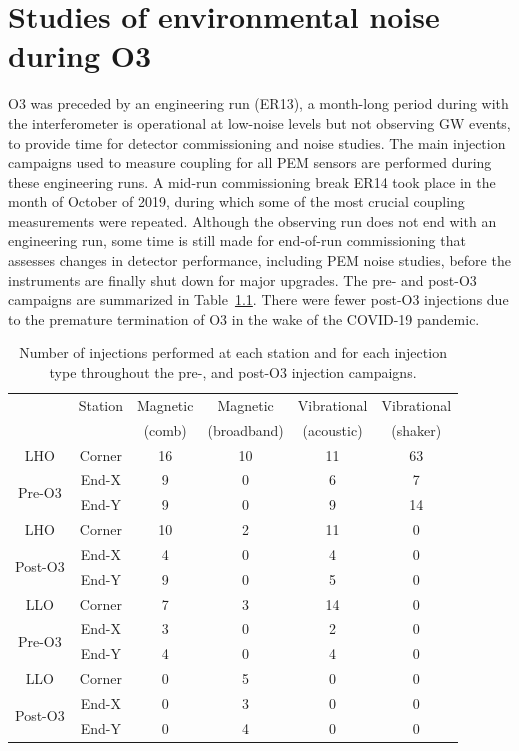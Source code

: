 \chapter{Studies of environmental noise during O3}\label{ch:noise-studies}

\ac{O3} was preceded by an engineering run (ER13), a month-long period during with the interferometer is operational at low-noise levels but not observing \ac{GW} events, to provide time for detector commissioning and noise studies.
The main injection campaigns used to measure coupling for all PEM sensors are performed during these engineering runs.
A mid-run commissioning break ER14 took place in the month of October of 2019, during which some of the most crucial coupling measurements were repeated.
Although the observing run does not end with an engineering run, some time is still made for end-of-run commissioning that assesses changes in detector performance, including PEM noise studies, before the instruments are finally shut down for major upgrades.
The pre- and post-O3 campaigns are summarized in Table~\ref{tab:noise-campaigns}.
There were fewer post-O3 injections due to the premature termination of O3 in the wake of the COVID-19 pandemic.

\begin{table}[htb]
	\caption{Number of injections performed at each station and for each injection type throughout the pre-, and post-O3 injection campaigns.}
	\label{tab:noise-campaigns}
	\begin{tabular}{|c|ccccc|}
		\hline
		& Station & Magnetic & Magnetic & Vibrational & Vibrational \\
		& & (comb) & (broadband) & (acoustic) & (shaker) \\
		\hline
		LHO & Corner & 16 & 10 & 11 & 63 \\
		\multirow{2}{*}{Pre-O3} & End-X & 9 & 0 & 6 & 7 \\
		& End-Y & 9 & 0 & 9 & 14 \\
		\hline
		LHO & Corner & 10 & 2 & 11 & 0 \\
		\multirow{2}{*}{Post-O3} & End-X & 4 & 0 & 4 & 0 \\
		& End-Y & 9 & 0 & 5 & 0 \\
		\hline
		LLO & Corner & 7 & 3 & 14 & 0 \\
		\multirow{2}{*}{Pre-O3} & End-X & 3 & 0 & 2 & 0 \\
		& End-Y & 4 & 0 & 4 & 0 \\
		\hline
		LLO & Corner & 0 & 5 & 0 & 0 \\
		\multirow{2}{*}{Post-O3} & End-X & 0 & 3 & 0 & 0 \\
		& End-Y & 0 & 4 & 0 & 0 \\
		\hline
	\end{tabular}

\end{table}


